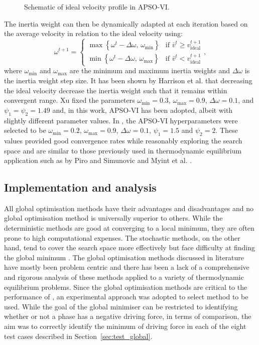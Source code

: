\begin{enumerate}
\begin{figure}[htbp]
				\caption{Schematic of ideal velocity profile in APSO-VI.}
				\label{fig:APSO-ideal_v}
			\end{figure}
			The inertia weight can then be dynamically adapted at each iteration based on the average velocity in relation to the ideal velocity \cite{Harrison:2018aa} using:
			\begin{equation}
				\omega^{t+1} =  \begin{cases}
								\max \left\{ \omega^t - \Delta \omega, \, \omega_\text{min}\right\}& \text{if } \bar{v}^t \geq  {v}_\text{ideal}^{t+1}\\
								\min \left\{ \omega^t - \Delta \omega, \, \omega_\text{max}\right\}& \text{if } \bar{v}^t <  {v}_\text{ideal}^{t+1}
							\end{cases},
			\end{equation}
			where $\omega_\text{min}$ and $\omega_\text{max}$ are the minimum and maximum inertia weights and $\Delta \omega$ is the inertia weight step size. It has been shown by Harrison et al. \cite{Harrison:2016aa} that decreasing the ideal velocity decrease the inertia weight such that it remains within convergent range. Xu fixed the parameters $\omega_\text{min} = 0.3$, $\omega_\text{max} = 0.9$, $\Delta \omega = 0.1$, and $\psi_1 = \psi_2 = 1.49$ \cite{Xu:2013aa} and, in this work, APSO-VI has been adopted, albeit with slightly different parameter values. In {\GEM}, the APSO-VI hyperparameters were selected to be $\omega_\text{min} = 0.2$, $\omega_\text{max} = 0.9$, $\Delta \omega = 0.1$, $\psi_1 = 1.5$ and  $\psi_2 = 2$. These values provided good convergence rates while reasonably exploring the search space and are similar to those previously used in thermodynamic equilibrium application such as by Piro and Simunovic \cite{Piro16} and Myint et al. \cite{Myint:2021aa}.
	\end{enumerate}

	
	\subsection{Implementation and analysis}
	All global optimisation methods have their advantages and disadvantages and no global optimisation method is universally superior to others. While the deterministic methods are good at converging to a local minimum, they are often prone to high computational expenses. The stochastic methods, on the other hand, tend to cover the search space more effectively but face difficulty at finding the global minimum \cite{Piro16}. The global optimisation methods discussed in literature have mostly been problem centric and there has been a lack of a comprehensive and rigorous analysis of these methods applied to a variety of thermodynamic equilibrium problems. 	Since the global optimisation methods are critical to the performance of {\GEM}, an experimental approach was adopted to select method to be used. While the goal of the global minimiser can be restricted to identifying whether or not a phase has a negative driving force, in terms of comparison, the aim was to correctly identify the minimum of driving force in each of the eight test cases described in Section~\ref{sec:test_global}.  
	
